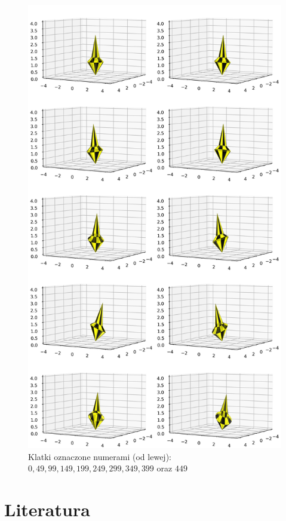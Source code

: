 \documentclass[a4paper,twoside,11pt,reqno]{mwrep}
\theoremstyle{plain} \newtheorem{twr}{Twierdzenie}
\theoremstyle{plain} \newtheorem{lem}{Lemat}
\theoremstyle{definition} \newtheorem{defi}{Definicja}
\theoremstyle{remark} \newtheorem*{wni}{Wniosek}
\theoremstyle{definition} \newtheorem{uwaga}{Uwaga}
\theoremstyle{definition}\newtheorem{prz}{Przykład}
\begin{document}
\begin{figure}[h]
\begin{center}
\includegraphics[width=13 cm]{MergedMatrix.png}
\caption{Klatki oznaczone numerami (od lewej): $0,49,99,149,199,249,299,349,399$ oraz $449$}
\end{center}
\end{figure}

\chapter{Literatura}
\end{document}
